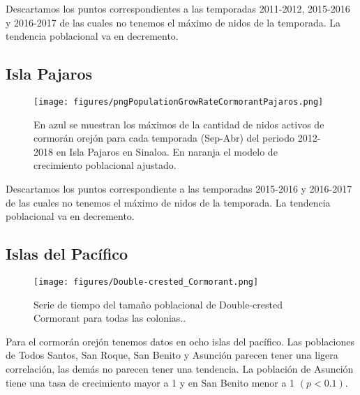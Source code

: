 \documentclass{article} %
\begin{document}
Descartamos los puntos correspondientes a las temporadas 2011-2012, 2015-2016 y 2016-2017 de las cuales no tenemos el máximo de nidos de la temporada. La tendencia poblacional va en decremento.


\subsection*{Isla Pajaros}

\begin{figure}[H]
\hspace{-2cm}
    \texttt{[image: figures/pngPopulationGrowRateCormorantPajaros.png]}
\caption{En azul se muestran los máximos de la cantidad de nidos activos de cormorán orejón para cada temporada (Sep-Abr) del periodo 2012-2018 en Isla Pajaros en Sinaloa. En naranja el modelo de crecimiento poblacional ajustado.}
\end{figure}

Descartamos los puntos correspondiente a las temporadas 2015-2016 y 2016-2017 de las cuales no tenemos el máximo de nidos de la temporada. La tendencia poblacional va en decremento.


\subsection*{Islas del Pacífico}

\begin{figure}[H]
\hspace{-2cm}
    \texttt{[image: figures/Double-crested\_Cormorant.png]}
\caption{Serie de tiempo del tamaño poblacional de Double-crested Cormorant para todas las colonias..}
\end{figure}

Para el cormorán orejón tenemos datos en ocho islas del pacífico. Las poblaciones de Todos Santos, San Roque, San Benito y Asunción parecen tener una ligera correlación, las demás no parecen tener una tendencia. La población de Asunción tiene una tasa de crecimiento mayor a 1 y en San Benito menor a 1 $(p < 0.1)$.

 

\end{document}
